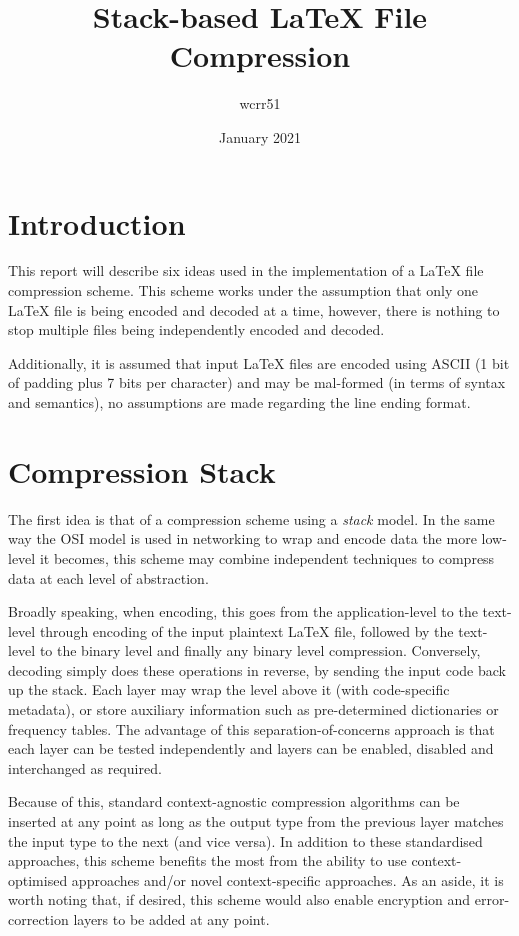 \documentclass[11pt]{article}
\title{\vspace{-2cm}Stack-based \LaTeX{} File Compression}
\author{wcrr51}
\date{January 2021}
\begin{document}
    \maketitle


    \section{Introduction}\label{sec:introduction}
    This report will describe six ideas used in the implementation of a \LaTeX{} file compression scheme.
    This scheme works under the assumption that only one \LaTeX{} file is being encoded and decoded at a time, however, there is nothing to stop multiple files being independently encoded and decoded.

    Additionally, it is assumed that input \LaTeX{} files are encoded using ASCII (1 bit of padding plus 7 bits per character) and may be mal-formed (in terms of syntax and semantics), no assumptions are made regarding the line ending format.


    \section{Compression Stack}\label{sec:compression-stack}
    The first idea is that of a compression scheme using a \textit{stack} model.
    In the same way the OSI model is used in networking to wrap and encode data the more low-level it becomes, this scheme may combine independent techniques to compress data at each level of abstraction.

    Broadly speaking, when encoding, this goes from the application-level to the text-level through encoding of the input plaintext \LaTeX{} file, followed by the text-level to the binary level and finally any binary level compression.
    Conversely, decoding simply does these operations in reverse, by sending the input code back up the stack.
    Each layer may wrap the level above it (with code-specific metadata), or store auxiliary information such as pre-determined dictionaries or frequency tables.
    The advantage of this separation-of-concerns approach is that each layer can be tested independently and layers can be enabled, disabled and interchanged as required.

    Because of this, standard context-agnostic compression algorithms can be inserted at any point as long as the output type from the previous layer matches the input type to the next (and vice versa).
    In addition to these standardised approaches, this scheme benefits the most from the ability to use context-optimised approaches and/or novel context-specific approaches.
    As an aside, it is worth noting that, if desired, this scheme would also enable encryption and error-correction layers to be added at any point.
\end{document}
